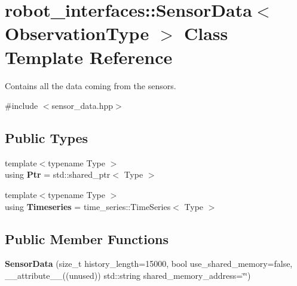 \hypertarget{classrobot__interfaces_1_1SensorData}{}\section{robot\+\_\+interfaces\+:\+:Sensor\+Data$<$ Observation\+Type $>$ Class Template Reference}
\label{classrobot__interfaces_1_1SensorData}


Contains all the data coming from the sensors.  




{\ttfamily \#include $<$sensor\+\_\+data.\+hpp$>$}

\subsection*{Public Types}
\begin{DoxyCompactItemize}
\item 
{\footnotesize template$<$typename Type $>$ }\\using {\bfseries Ptr} = std\+::shared\+\_\+ptr$<$ Type $>$\hypertarget{classrobot__interfaces_1_1SensorData_a3bcc04997ea43afa13c7fdafe231818c}{}\label{classrobot__interfaces_1_1SensorData_a3bcc04997ea43afa13c7fdafe231818c}

\item 
{\footnotesize template$<$typename Type $>$ }\\using {\bfseries Timeseries} = time\+\_\+series\+::\+Time\+Series$<$ Type $>$\hypertarget{classrobot__interfaces_1_1SensorData_a3083518bc6f7fb8baf625a1551044088}{}\label{classrobot__interfaces_1_1SensorData_a3083518bc6f7fb8baf625a1551044088}

\end{DoxyCompactItemize}
\subsection*{Public Member Functions}
\begin{DoxyCompactItemize}
\item 
{\bfseries Sensor\+Data} (size\+\_\+t history\+\_\+length=15000, bool use\+\_\+shared\+\_\+memory=false, \+\_\+\+\_\+attribute\+\_\+\+\_\+((unused)) std\+::string shared\+\_\+memory\+\_\+address=\char`\"{}\char`\"{})\hypertarget{classrobot__interfaces_1_1SensorData_a386f5c340d91c2ad8f484a642c91ee86}{}\label{classrobot__interfaces_1_1SensorData_a386f5c340d91c2ad8f484a642c91ee86}

\end{DoxyCompactItemize}
